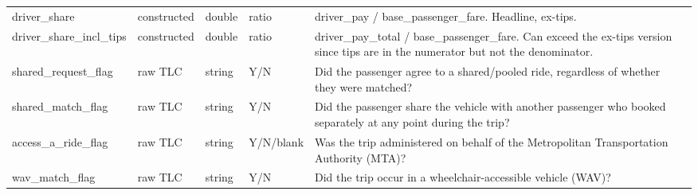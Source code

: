 \begin{longtable}{llllll}
driver_share & constructed & double & ratio & driver_pay / base_passenger_fare. Headline, ex-tips. &  \\
driver_share_incl_tips & constructed & double & ratio & driver_pay_total / base_passenger_fare. Can exceed the ex-tips version since tips are in the numerator but not the denominator. &  \\
shared_request_flag & raw TLC & string & Y/N & Did the passenger agree to a shared/pooled ride, regardless of whether they were matched? &  \\
shared_match_flag & raw TLC & string & Y/N & Did the passenger share the vehicle with another passenger who booked separately at any point during the trip? &  \\
access_a_ride_flag & raw TLC & string & Y/N/blank & Was the trip administered on behalf of the Metropolitan Transportation Authority (MTA)? &  \\
wav_match_flag & raw TLC & string & Y/N & Did the trip occur in a wheelchair-accessible vehicle (WAV)? &  \\
\end{longtable}

